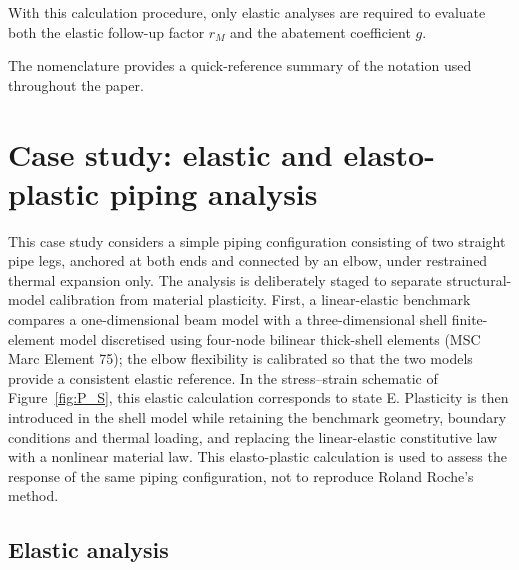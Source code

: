 \documentclass[10pt,a4paper]{article}
\let\oldsection\section
\newif\ifsectionstarted
\renewcommand{\section}{%
  \ifsectionstarted\clearpage\else\global\sectionstartedtrue\FloatBarrier\fi
  \oldsection}
\begin{document}
With this calculation procedure, only elastic analyses are required to evaluate both the elastic follow-up factor \(r_M\) and the abatement coefficient \(g\).




The nomenclature provides a quick-reference summary of the notation used throughout the paper.


\newpage
\section{Case study: elastic and elasto-plastic piping analysis}
This case study considers a simple piping configuration consisting of two straight pipe legs, anchored at both ends and connected by an elbow, under restrained thermal expansion only. The analysis is deliberately staged to separate structural-model calibration from material plasticity. First, a linear-elastic benchmark compares a one-dimensional beam model with a three-dimensional shell finite-element model discretised using four-node bilinear thick-shell elements (MSC Marc Element 75); the elbow flexibility is calibrated so that the two models provide a consistent elastic reference. In the stress--strain schematic of Figure~\ref{fig:P_S}, this elastic calculation corresponds to state E. Plasticity is then introduced in the shell model while retaining the benchmark geometry, boundary conditions and thermal loading, and replacing the linear-elastic constitutive law with a nonlinear material law. This elasto-plastic calculation is used to assess the response of the same piping configuration, not to reproduce Roland Roche's method.

\subsection{Elastic analysis}
\label{sec:elastic-analysis}
\end{document}
